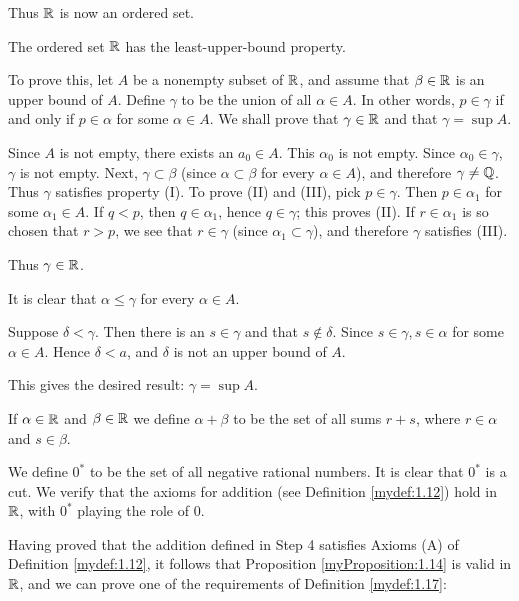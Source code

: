 Thus ${\protect\mathbb R}$ is now an ordered set.


The ordered set ${\protect\mathbb R}$ has the least-upper-bound property.

To prove this, let $A$ be a nonempty subset of ${\protect\mathbb R}$, 
and assume that $\beta \in {\protect\mathbb R}$ is an upper bound of $A$. 
Define $\gamma$ to be the union of all $\alpha \in A$. 
In other words, $p \in \gamma$ if and only if $p \in \alpha$ for some $\alpha \in A$. 
We shall prove that $\gamma \in {\protect\mathbb R}$ and that $\gamma = \sup A$.

Since $A$ is not empty, there exists an $a_0 \in A$. 
This $\alpha_0$ is not empty. 
Since $\alpha_0 \in \gamma$, $\gamma$ is not empty. 
Next, $\gamma \subset \beta$ 
(since $\alpha \subset \beta$ for every $\alpha \in A$), 
and therefore $\gamma \neq {\protect\mathbb Q}$. 
Thus $\gamma$ satisfies property (I). 
To prove (II) and (III), pick $p \in \gamma$. 
Then $p \in \alpha_1$ for some $\alpha_1 \in A$. 
If $q <p$, then $q \in \alpha_1$, hence $q \in \gamma$; this proves (II). 
If $r \in \alpha_1$ is so chosen that $r > p$, 
we see that $r\in \gamma$ (since $\alpha_1 \subset \gamma$), 
and therefore $\gamma$ satisfies (III).

Thus $\gamma \in {\protect\mathbb R}$.

It is clear that $\alpha \leq \gamma$ for every $\alpha \in A$.

Suppose $\delta < \gamma$. 
Then there is an $s \in \gamma$ and that $s \not\in \delta$. 
Since $s \in \gamma, s \in \alpha$ for some $\alpha \in A$. 
Hence $\delta <a$, and $\delta$ is not an upper bound of $A$.

This gives the desired result: $\gamma = \sup A$.


If $\alpha \in {\protect\mathbb R}$ and $\beta \in {\protect\mathbb R}$ 
we define $\alpha + \beta$ to be the set of all sums $r + s$, 
where $r \in \alpha$ and $s \in \beta$.

We define $0^*$ to be the set of all negative rational numbers. 
It is clear that $0^*$ is a cut. 
We verify that the axioms for addition 
(see Definition \ref{mydef:1.12}) 
hold in ${\protect\mathbb R}$, with $0^*$ playing the role of $0$.

Having proved that the addition defined in Step 4 satisfies Axioms (A) of Definition \ref{mydef:1.12}, 
it follows that Proposition \ref{myProposition:1.14} is valid in ${\protect\mathbb R}$, and we can
prove one of the requirements of Definition \ref{mydef:1.17}:

